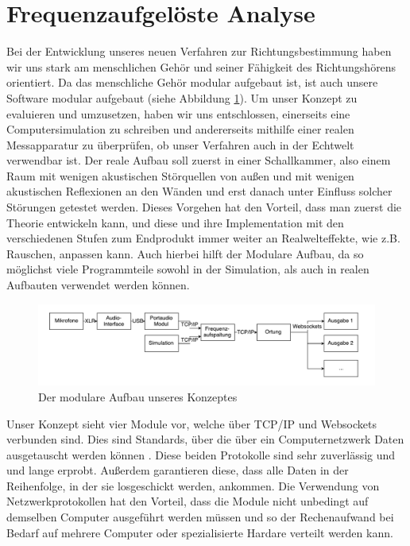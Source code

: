 \section{Frequenzaufgelöste Analyse}
Bei der Entwicklung unseres neuen Verfahren zur Richtungsbestimmung haben wir uns stark am menschlichen Gehör und seiner Fähigkeit des Richtungshörens orientiert. Da das menschliche Gehör modular aufgebaut ist, ist auch unsere Software modular aufgebaut (siehe Abbildung \ref{fig:flowchart}).
Um unser Konzept zu evaluieren und umzusetzen, haben wir uns entschlossen, einerseits eine Computersimulation zu schreiben und andererseits mithilfe einer realen Messapparatur zu überprüfen, ob unser Verfahren auch in der Echtwelt verwendbar ist. Der reale Aufbau soll zuerst in einer Schallkammer, also einem Raum mit wenigen akustischen Störquellen von außen und mit wenigen akustischen Reflexionen an den Wänden und erst danach unter Einfluss solcher Störungen getestet werden. Dieses Vorgehen hat den Vorteil, dass man zuerst die Theorie entwickeln kann, und diese und ihre Implementation mit den verschiedenen Stufen zum  Endprodukt immer weiter an Realwelteffekte, wie z.B. Rauschen, anpassen kann.
Auch hierbei hilft der Modulare Aufbau, da so möglichst viele Programmteile sowohl in der Simulation, als auch in realen Aufbauten verwendet werden können.
\begin{figure}[H]
    \includegraphics[width=\linewidth]{img/flowchart}
	\caption{Der modulare Aufbau unseres Konzeptes}
	\label{fig:flowchart}
\end{figure}
Unser Konzept sieht vier Module vor, welche über TCP/IP und Websockets verbunden sind. Dies sind Standards, über die über ein Computernetzwerk Daten ausgetauscht werden können \cite{tcp} \cite{websockets}. Diese beiden Protokolle sind sehr zuverlässig und und lange erprobt. Außerdem garantieren diese, dass alle Daten in der Reihenfolge, in der sie losgeschickt werden, ankommen. Die Verwendung von Netzwerkprotokollen hat den Vorteil, dass die Module nicht unbedingt auf demselben Computer ausgeführt werden müssen und so der Rechenaufwand bei Bedarf auf mehrere Computer oder spezialisierte Hardare verteilt werden kann.


